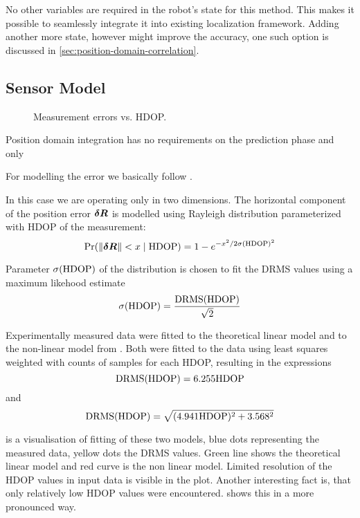 No other variables are required in the robot's state for this method.
This makes it possible to seamlessly integrate it into existing localization framework.
Adding another more state, however might improve the accuracy, one such option
is discussed in \cref{sec:position-domain-correlation}.

\subsection{Sensor Model}
\label{sec:wgs84-hdop-error}

\begin{figure}[htp]
	\centering
	\noindent{}
	\caption{Measurement errors vs. HDOP.}
	\label{fig:wgs84-hdop-error}
\end{figure}

Position domain integration has no requirements on the prediction phase
and only 

For modelling the error we basically follow \cite{www-wilson}.

In this case we are operating only in two dimensions.
The horizontal component of the position error  \(\bm{\delta R}\) is modelled using Rayleigh distribution
parameterized with HDOP of the measurement:
\begin{equation}
	\operatorname{\mathrm{Pr}}(\lVert\bm{\delta R}\rVert < x \mid \mathrm{HDOP}) =
		1 - e^{-x^2/2\sigma(\mathrm{HDOP})^2}
\end{equation}

Parameter \(\sigma(\mathrm{HDOP})\) of the distribution is chosen to fit the DRMS values using a maximum likehood estimate
\begin{equation}
	\sigma(\mathrm{HDOP}) = \frac{\mathrm{DRMS}(\mathrm{HDOP})}{\sqrt{2}}
\end{equation}

Experimentally measured data were fitted to the theoretical linear model and to
the non-linear model from \cite{www-wilson}.
Both were fitted to the data using least squares weighted with counts of samples
for each HDOP, resulting in the expressions
\begin{equation}
\mathrm{DRMS}(\mathrm{HDOP}) = \num{6.255} \mathrm{HDOP}
\end{equation}
and
\begin{equation}
\mathrm{DRMS}(\mathrm{HDOP}) = \sqrt{(\num{4.941}\mathrm{HDOP})^2 + \num{3.568}^2}
\end{equation}

 is a visualisation of fitting of these two models,
blue dots representing the measured data, yellow dots the DRMS values.
Green line shows the theoretical linear model and red curve is the non linear model.
Limited resolution of the HDOP values in input data is visible in the plot.
Another interesting fact is, that only relatively low HDOP values were encountered.
 shows this in a more pronounced way.

